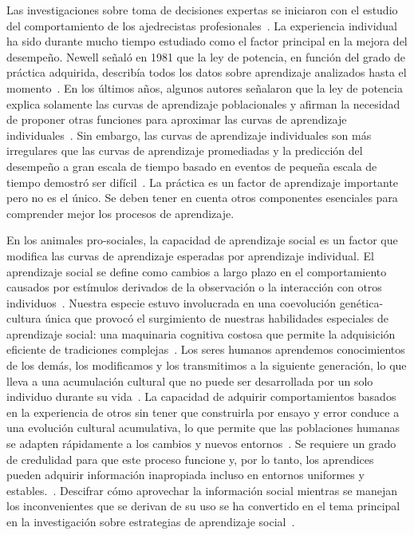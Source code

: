 \documentclass[a4paper,11pt]{book}
\theoremstyle{definition}
\begin{document}
Las investigaciones sobre toma de decisiones expertas se iniciaron con el estudio del comportamiento de los ajedrecistas profesionales~\cite{deGroot1978-thoughtAndChoiceInChess,chase1973-perceptionInChess,simon1974-howBigIsAChunk}.
%
La experiencia individual ha sido durante mucho tiempo estudiado como el factor principal en la mejora del desempe\~no.
%
Newell se\~nal\'o en 1981 que la ley de potencia, en funci\'on del grado de pr\'actica adquirida, describ\'ia todos los datos sobre aprendizaje analizados hasta el momento~\cite{Newell1981}.
%
En los \'ultimos a\~nos, algunos autores se\~nalaron que la ley de potencia explica solamente las curvas de aprendizaje poblacionales y afirman la necesidad de proponer otras funciones para aproximar las curvas de aprendizaje individuales~\cite{heathcote2000-powerLawRepealedExponentialLawOfPractice}.
%
Sin embargo, las curvas de aprendizaje individuales son m\'as irregulares que las curvas de aprendizaje promediadas y la predicci\'on del desempe\~no a gran escala de tiempo basado en eventos de peque\~na escala de tiempo demostr\'o ser dif\'icil~\cite{howard2014-learningCurvesChessPlayersATestOfPowerLawGenerality}.
%
La pr\'actica es un factor de aprendizaje importante pero no es el \'unico.
%
Se deben tener en cuenta otros componentes esenciales para comprender mejor los procesos de aprendizaje.


En los animales pro-sociales, la capacidad de aprendizaje social es un factor que modifica las curvas de aprendizaje esperadas por aprendizaje individual.
%
El aprendizaje social se define como cambios a largo plazo en el comportamiento causados por est\'imulos derivados de la observaci\'on o la interacci\'on con otros individuos~\cite{hoppitt2013-socialLearningAnIntroductionBook,bandura1977-socialLearning}.
%
Nuestra especie estuvo involucrada en una coevoluci\'on gen\'etica-cultura \'unica que provoc\'o el surgimiento de nuestras habilidades especiales de aprendizaje social: una maquinaria cognitiva costosa que permite la adquisici\'on eficiente de tradiciones complejas~\cite{Richerson2010}.
%
Los seres humanos aprendemos conocimientos de los dem\'as, los modificamos y los transmitimos a la siguiente generaci\'on, lo que lleva a una acumulaci\'on cultural que no puede ser desarrollada por un solo individuo durante su vida~\cite{boyd1985-evolutionaryProcess}.
%
La capacidad de adquirir comportamientos basados en la experiencia de otros sin tener que construirla por ensayo y error conduce a una evoluci\'on cultural acumulativa, lo que permite que las poblaciones humanas se adapten r\'apidamente a los cambios y nuevos entornos~\cite{Boyd2011}.
%
Se requiere un grado de credulidad para que este proceso funcione y, por lo tanto, los aprendices pueden adquirir informaci\'on inapropiada incluso en entornos uniformes y estables.~\cite{feldman1996-individualVsSocialLearningEvolutionaryAnalysis,giraldeau2002-potentialDisadvantagesSocialLearning}.
%
Descifrar c\'omo aprovechar la informaci\'on social mientras se manejan los inconvenientes que se derivan de su uso se ha convertido en el tema principal en la investigaci\'on sobre estrategias de aprendizaje social~\cite{henrich2003-evolutionOfCulturalEvolution,rendell2011-cognitiveCulture}.
\end{document}
